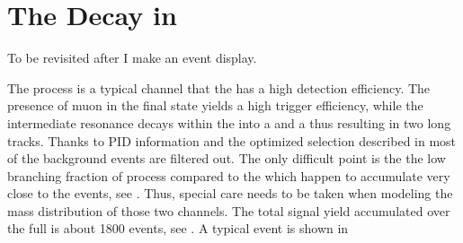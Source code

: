 \section{The \BJpsiKst Decay in \lhcb}
\label{BspsiKst_at_lhcb}
{\color{red} To be revisited after I make an event display.}

The \BsJpsiKst process is a typical channel that the \lhcb has a high detection efficiency.
The presence of muon in the final state yields a high trigger efficiency, while the intermediate
\Kstar resonance decays within the \velo into a \kaon and a \pion thus resulting in two long tracks.
Thanks to PID information and the optimized selection described in  most of the background
events are filtered out. The only difficult point is the the low branching fraction of \BsJpsiKst process
compared to the \BdJpsiKst which happen to accumulate very close to the \BsJpsiKst events, see .
Thus, special care needs to be taken when modeling the mass distribution of those two channels.
The total \BsJpsiKst signal yield accumulated over the full \runone is about 1800 events, see .
A typical \BsJpsiKst event is  shown in 


